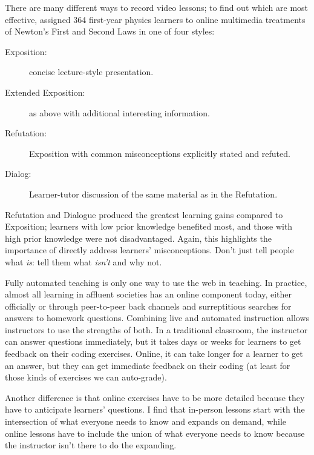 There are many different ways to record video lessons;
to find out which are most effective,
\cite{Mull2007a} assigned 364 first-year physics learners
to online multimedia treatments of Newton's First and Second Laws in one of four styles:

\begin{description}

\item[Exposition:]
  concise lecture-style presentation.

\item[Extended Exposition:]
  as above with additional interesting information.

\item[Refutation:]
  Exposition with common misconceptions explicitly stated and refuted.

\item[Dialog:]
  Learner-tutor discussion of the same material as in the Refutation.

\end{description}

Refutation and Dialogue produced the greatest learning gains compared to Exposition;
learners with low prior knowledge benefited most,
and those with high prior knowledge were not disadvantaged.
Again,
this highlights the importance of directly address learners' misconceptions.
Don't just tell people what \emph{is}:
tell them what \emph{isn't} and why not.


Fully automated teaching is only one way to use the web in teaching.
In practice,
almost all learning in affluent societies has an online component today,
either officially
or through peer-to-peer back channels and surreptitious searches for answers to homework questions.
Combining live and automated instruction allows instructors to use the strengths of both.
In a traditional classroom,
the instructor can answer questions immediately,
but it takes days or weeks for learners to get feedback on their coding exercises.
Online,
it can take longer for a learner to get an answer,
but they can get immediate feedback on their coding
(at least for those kinds of exercises we can auto-grade).

Another difference is that
online exercises have to be more detailed
because they have to anticipate learners' questions.
I find that in-person lessons start with the intersection of what everyone needs to know and expands on demand,
while online lessons have to include the union of what everyone needs to know
because the instructor isn't there to do the expanding.

